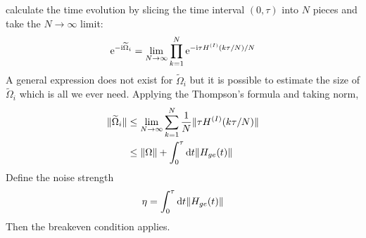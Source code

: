 \documentclass[pra,reprint,superscriptaddress]{revtex4-2}
\newcommand{\wt}[1]{\widetilde{#1}}
\begin{document}
calculate the time evolution by slicing the time interval $(0,\tau)$ into $N$ pieces and take the $N\to\infty$ limit:
\begin{equation}
 \upe^{-\upi \wt \Omega_i} = \lim_{N\to\infty} \prod_{k=1}^N 
 \upe^{-\upi \tau H\up{I}(k \tau/N)/N}
\end{equation}
A general expression does not exist for $\wt \Omega_i$ but it is possible to estimate the size of $\wt \Omega_i$ which is all we ever need. 
Applying the Thompson's formula and taking norm, 
\begin{equation}
\begin{split}
 \norm{\wt \Omega_i} &\le \lim_{N\to\infty}\sum_{k=1}^N \frac{1}{N} \norm{\tau H\up{I}(k \tau/N)}\\
 &\le \norm{\Omega} + \int_0^\tau \dd t \norm{H_{ge}(t)}
\end{split}
\end{equation}
Define the noise strength
\begin{equation}
\eta =  \int_0^\tau \mathop{}\!\mathrm{d} t \Vert {H_{ge}(t)} \Vert
\end{equation}
Then the breakeven condition applies.

\newpage
\end{document}
